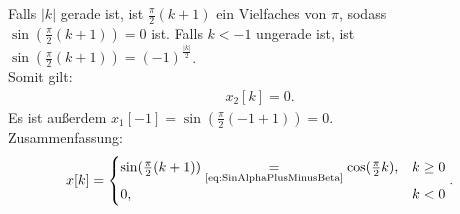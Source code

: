 \documentclass[11pt,a4paper,DIV=12]{scrartcl}
\begin{document}
Falls $|k|$ gerade ist, ist $\frac{\pi}{2}(k+1)$ ein Vielfaches von $\pi$, sodass $\sin(\frac{\pi}{2}(k+1))=0$ ist.
Falls $k<-1$ ungerade ist, ist $\sin(\frac{\pi}{2}(k+1))=(-1)^{\frac{|k|}{2}}$.\\
Somit gilt:
\begin{align}
	x_2[k]=0.
\end{align}
Es ist außerdem $x_1[-1] =\sin(\frac{\pi}{2}(-1+1))=0$. \\
Zusammenfassung:
\begin{align}
	x[k]=\begin{cases}
		\sin(\frac{\pi}{2}(k+1))\underset{\text{\eqref{eq:SinAlphaPlusMinusBeta}}}{=}\cos(\frac{\pi}{2}k), &k\geq 0 \\
		0, &k<0
	\end{cases}.
\end{align}
\end{document}

